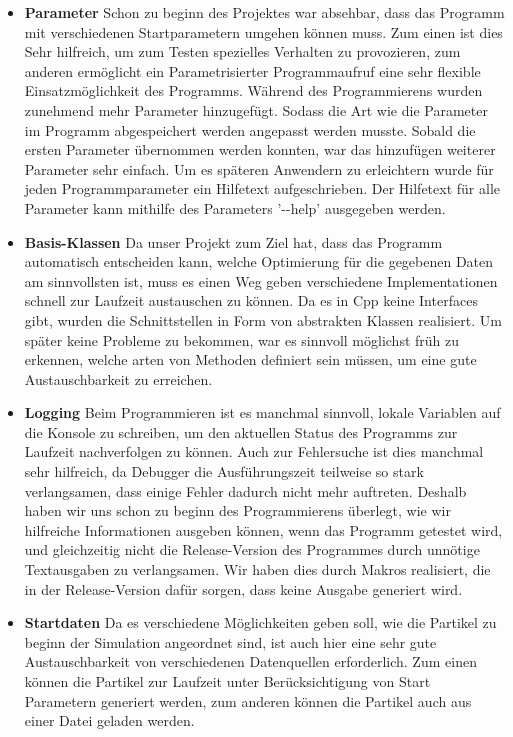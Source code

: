 \documentclass[
	12pt,
	a4paper,
	BCOR10mm,
	DIV14,
	headsepline,
]{scrreprt}
\begin{document}
\begin{itemize}
	\item \textbf{Parameter} Schon zu beginn des Projektes war absehbar, dass das Programm mit verschiedenen Startparametern umgehen können muss. Zum einen ist dies Sehr hilfreich, um zum Testen spezielles Verhalten zu provozieren, zum anderen ermöglicht ein Parametrisierter Programmaufruf eine sehr flexible Einsatzmöglichkeit des Programms. Während des Programmierens wurden zunehmend mehr Parameter hinzugefügt. Sodass die Art wie die Parameter im Programm abgespeichert werden angepasst werden musste. Sobald die ersten Parameter übernommen werden konnten, war das hinzufügen weiterer Parameter sehr einfach. Um es späteren Anwendern zu erleichtern wurde für jeden Programmparameter ein Hilfetext aufgeschrieben. Der Hilfetext für alle Parameter kann mithilfe des Parameters '-{}-help' ausgegeben werden.
	\item \textbf{Basis-Klassen} Da unser Projekt zum Ziel hat, dass das Programm automatisch entscheiden kann, welche Optimierung für die gegebenen Daten am sinnvollsten ist, muss es einen Weg geben verschiedene Implementationen schnell zur Laufzeit austauschen zu können. Da es in Cpp keine Interfaces gibt, wurden die Schnittstellen in Form von abstrakten Klassen realisiert. Um später keine Probleme zu bekommen, war es sinnvoll möglichst früh zu erkennen, welche arten von Methoden definiert sein müssen, um eine gute Austauschbarkeit zu erreichen.
	\item \textbf{Logging} Beim Programmieren ist es manchmal sinnvoll, lokale Variablen auf die Konsole zu schreiben, um den aktuellen Status des Programms zur Laufzeit nachverfolgen zu können. Auch zur Fehlersuche ist dies manchmal sehr hilfreich, da Debugger die Ausführungszeit teilweise so stark verlangsamen, dass einige Fehler dadurch nicht mehr auftreten. Deshalb haben wir uns schon zu beginn des Programmierens überlegt, wie wir hilfreiche Informationen ausgeben können, wenn das Programm getestet wird, und gleichzeitig nicht die Release-Version des Programmes durch unnötige Textausgaben zu verlangsamen. Wir haben dies durch Makros realisiert, die in der Release-Version dafür sorgen, dass keine Ausgabe generiert wird.
	\item \textbf{Startdaten} Da es verschiedene Möglichkeiten geben soll, wie die Partikel zu beginn der Simulation angeordnet sind, ist auch hier eine sehr gute Austauschbarkeit von verschiedenen Datenquellen erforderlich. Zum einen können die Partikel zur Laufzeit unter Berücksichtigung von Start Parametern generiert werden, zum anderen können die Partikel auch aus einer Datei geladen werden. 

\end{itemize}
\end{document}
